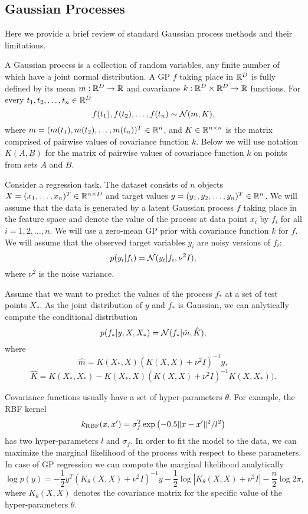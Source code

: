 \subsection{Gaussian Processes}
  Here we provide a brief review of standard Gaussian process methods and their
  limitations.

  A Gaussian process is a collection of random variables, any finite number of
  which have a joint normal distribution. A GP $f$ taking place in $\mathbb{R}^D$ is
  fully defined by its mean $m: \mathbb{R}^D \rightarrow \mathbb{R}$ and covariance
  $k: \mathbb{R}^D \times \mathbb{R}^D \rightarrow \mathbb{R}$ functions. For every $t_1, t_2, \ldots, t_n \in \mathbb{R}^D$
  \[
    f(t_1), f(t_2), \ldots, f(t_n) \sim \mathcal{N}(m, K),
  \]
  where $m = (m(t_1), m(t_2), \ldots, m(t_n))^T \in \mathbb{R}^n$, and
  $K\in \mathbb{R}^{n \times n}$ is the matrix comprised of pairwise values of covariance
  function $k$. Below we will use notation $K(A, B)$ for the matrix of pairwise
  values of covariance function $k$ on points from sets $A$ and $B$.

  Consider a regression task. The dataset consists of
  $n$ objects $X = (x_1, \ldots, x_n)^T \in \mathbb{R}^{n \times D}$ and target values
  $y = (y_1, y_2, \ldots, y_n)^T \in \mathbb{R}^n$. We will assume that the data is
  generated by a latent Gaussian process $f$ taking place in the feature space
  and denote the value of the process at data point $x_i$ by $f_i$ for all
  $i = 1, 2, \ldots, n$. We will use a zero-mean GP prior with covariance function
  $k$ for $f$. We will assume that the observed target variables $y_i$
  are noisy versions of $f_i$:
  \[
    p(y_i | f_i) = \mathcal{N}(y_i | f_i, \nu^2 I),
  \]
  where $\nu^2$ is the noise variance.

  Assume that we want to predict the values of the process $f_*$ at a set of test
  points
  $X_*$. As the joint distribution of $y$ and $f_*$ is Gaussian, we can anlytically
  compute the conditional distribution
  \[
    p(f_* | y, X, X_*) = \mathcal{N}(f_* | \hat m, \hat K),
  \]
  where
  \[
      \hat m = K(X_*, X) (K(X, X) + \nu^2 I)^{-1} y,
  \]
  \[
      \hat K = K(X_*, X_*) - K(X_*, X)(K(X, X) + \nu^2 I)^{-1} K(X, X_*)).
  \]

  Covariance functions usually have a set of hyper-parameters $\theta$.
  For example, the RBF kernel
  \[
    k_{\mbox{\scriptsize RBF}} (x, x') = \sigma_f^2 \exp\left(- 0.5 \Vert x - x'\Vert^2 / l^2 \right)
  \]
  has two hyper-parameters $l$ and $\sigma_f$. In order to fit the model to the data,
  we can maximize the marginal likelihood of the process with respect to these
  parameters. In case of GP regression we can compute the marginal likelihood
  analytically
  \[
    \log p(y) = -\frac 1 2 y^T (K_{\theta}(X, X) + \nu^2 I)^{-1} y -
    \frac 1 2 \log |K_{\theta} (X, X) + \nu^2 I| - \frac n 2 \log 2 \pi,
  \]
  where $K_{\theta}(X, X)$ denotes the covariance matrix for the specific
  value of the hyper-parameters $\theta$.

